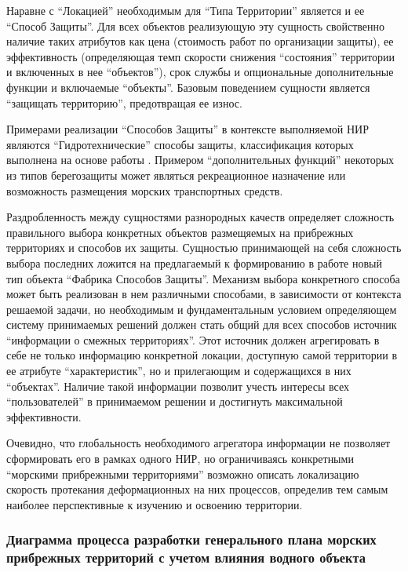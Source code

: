 Наравне с \enquote{Локацией} необходимым для \enquote{Типа Территории} является и ее \enquote{Способ Защиты}.
Для всех объектов реализующую эту сущность свойственно наличие таких атрибутов как цена (стоимость работ по организации защиты), ее эффективность (определяющая темп скорости снижения \enquote{состояния} территории и включенных в нее \enquote{объектов}), срок службы и опциональные дополнительные функции и включаемые \enquote{объекты}.
Базовым поведением сущности является \enquote{защищать территорию}, предотвращая ее износ.

Примерами реализации \enquote{Способов Защиты} в контексте выполняемой НИР являются \enquote{Гидротехнические} способы защиты, классификация которых выполнена на основе работы \cite{Huynh2024HybridCoastalDefence}.
Примером \enquote{дополнительных функций} некоторых из типов берегозащиты может являться рекреационное назначение или возможность размещения морских транспортных средств.

Раздробленность  между сущностями разнородных качеств определяет сложность правильного выбора конкретных объектов размещяемых на прибрежных территориях и способов их защиты.
Сущностью принимающей на себя сложность выбора последних ложится на предлагаемый к формированию в работе новый тип объекта \enquote{Фабрика Способов Защиты}.
Механизм выбора конкретного способа может быть реализован в нем различными способами, в зависимости от контекста решаемой задачи, но необходимым и фундаментальным условием определяющем систему принимаемых решений должен стать общий для всех способов источник \enquote{информации о смежных территориях}.
Этот источник должен агрегировать в себе не только информацию конкретной локации, доступную самой территории в ее атрибуте \enquote{характеристик}, но и прилегающим и содержащихся в них \enquote{объектах}.
Наличие такой информации позволит учесть интересы всех \enquote{пользователей} в принимаемом решении и достигнуть максимальной эффективности.

Очевидно, что глобальность необходимого агрегатора информации не позволяет сформировать его в рамках одного НИР, но ограничиваясь конкретными \enquote{морскими прибрежными территориями} возможно  описать локализацию скорость протекания деформационных на них процессов, определив тем самым наиболее перспективные к изучению и освоению территории.   



\subsubsection{Диаграмма процесса разработки генерального плана морских прибрежных территорий с учетом влияния водного объекта}

